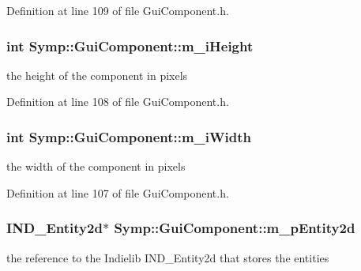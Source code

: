 Definition at line 109 of file Gui\-Component.\-h.

\hypertarget{class_symp_1_1_gui_component_aa84bb60b7aa1adb1522c63acff2909c2}{
\subsubsection[{m\-\_\-i\-Height}]{\setlength{\rightskip}{0pt plus 5cm}int Symp\-::\-Gui\-Component\-::m\-\_\-i\-Height\hspace{0.3cm}{\ttfamily [protected]}}}\label{class_symp_1_1_gui_component_aa84bb60b7aa1adb1522c63acff2909c2}
the height of the component in pixels 

Definition at line 108 of file Gui\-Component.\-h.

\hypertarget{class_symp_1_1_gui_component_ad4c3e34b824e1f9d6a030ca54fc1a7cf}{
\subsubsection[{m\-\_\-i\-Width}]{\setlength{\rightskip}{0pt plus 5cm}int Symp\-::\-Gui\-Component\-::m\-\_\-i\-Width\hspace{0.3cm}{\ttfamily [protected]}}}\label{class_symp_1_1_gui_component_ad4c3e34b824e1f9d6a030ca54fc1a7cf}
the width of the component in pixels 

Definition at line 107 of file Gui\-Component.\-h.

\hypertarget{class_symp_1_1_gui_component_ae2548627f8f866222e13347cc4284b24}{
\subsubsection[{m\-\_\-p\-Entity2d}]{\setlength{\rightskip}{0pt plus 5cm}I\-N\-D\-\_\-\-Entity2d$\ast$ Symp\-::\-Gui\-Component\-::m\-\_\-p\-Entity2d\hspace{0.3cm}{\ttfamily [protected]}}}\label{class_symp_1_1_gui_component_ae2548627f8f866222e13347cc4284b24}
the reference to the Indielib I\-N\-D\-\_\-\-Entity2d that stores the entities 

